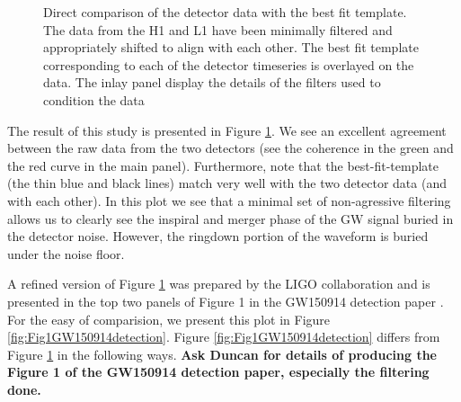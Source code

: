 \begin{figure}
\caption{Direct comparison of the detector data with the best fit template. The data from the H1 and L1 have been minimally filtered and  appropriately shifted to align with each other. The best fit template corresponding to each of the detector timeseries is overlayed on the data. The inlay panel display the details of the filters used to condition the data}
\label{fig:overlayGW150914}
\end{figure}

The result of this study is presented in Figure \ref{fig:overlayGW150914}. We see an excellent agreement between the raw data from the two detectors (see the coherence in the green and the red curve in the main panel). Furthermore, note that the best-fit-template (the thin blue and black lines) match very well with the two detector data (and with each other). In this plot we see that a minimal set of non-agressive filtering allows us to clearly see the inspiral and merger phase of the GW signal buried in the detector noise. However, the ringdown portion of the waveform is buried under the noise floor. 

A refined version of Figure \ref{fig:overlayGW150914} was prepared by the LIGO collaboration and is presented in the top two panels of Figure 1 in the GW150914 detection paper \cite{gw150914detection}. For the easy of comparision, we present this plot in Figure \ref{fig:Fig1GW150914detection}. Figure \ref{fig:Fig1GW150914detection} differs from Figure \ref{fig:overlayGW150914} in the following ways. \textbf{Ask Duncan for details of producing the Figure 1 of the GW150914 detection paper, especially the filtering done.}




